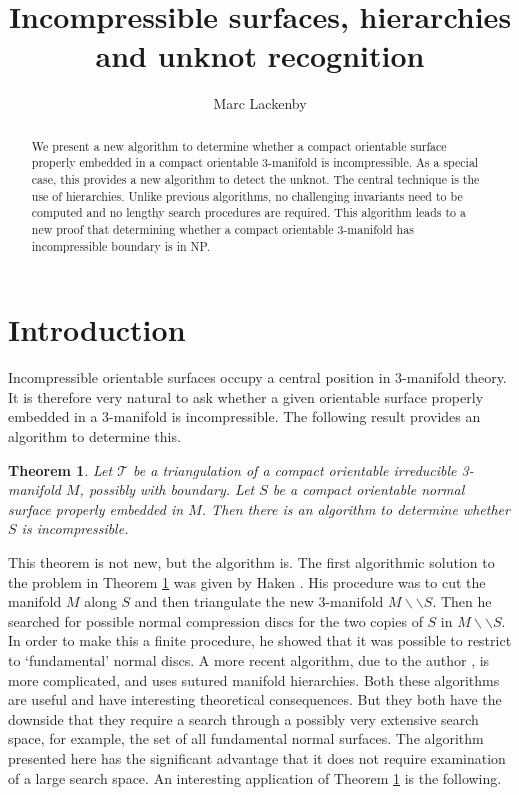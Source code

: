 \documentclass[oneside]{amsart}
\title[Incompressible surfaces, hierarchies and unknot recognition]{Incompressible surfaces, hierarchies \\ and unknot recognition}
\author{Marc Lackenby}
\numberwithin{equation}{section}
\theoremstyle{plain}
\newtheorem{theorem}[equation]{Theorem}
\theoremstyle{definition}
\newcommand{\cut}{\backslash\backslash}
\begin{document}
\begin{abstract} \hspace{0.2cm}
We present a new algorithm to determine whether a compact orientable surface properly embedded in
a compact orientable 3-manifold is incompressible.  As a special case, this provides a new
algorithm to detect the unknot. The central technique is the use of hierarchies. Unlike previous algorithms, no challenging invariants need
to be computed and no lengthy search procedures are required. This algorithm leads to a new proof
that determining whether a compact orientable 3-manifold has incompressible boundary 
is in NP.
\end{abstract}
\maketitle
\tableofcontents


\section{Introduction}\label{Sec:Intro}
Incompressible orientable surfaces occupy a central position in 3-manifold theory. It is therefore very natural to ask whether a given orientable surface properly embedded in a 3-manifold is incompressible. The following result provides an algorithm to determine this.

\begin{theorem}
\label{Thm:AlgorithmIncompressible}
Let $\mathcal{T}$ be a triangulation of a compact orientable irreducible 3-manifold $M$, possibly with boundary. Let $S$ be a compact orientable normal surface properly embedded in $M$. Then there is an algorithm to determine whether $S$ is incompressible.
\end{theorem}

This theorem is not new, but the algorithm is. The first algorithmic solution to the problem in Theorem \ref{Thm:AlgorithmIncompressible} was given by Haken  \cite{Haken:Normal}. His procedure was to cut the manifold $M$ along $S$ and then triangulate the new 3-manifold $M \cut S$. Then he searched for possible normal compression discs for the two copies of $S$ in $M \cut S$. In order to make this a finite procedure, he showed that it was possible to restrict to `fundamental' normal discs. A more recent algorithm, due to the author \cite{Lackenby:EfficientCertification}, is more complicated, and uses sutured manifold hierarchies. Both these algorithms are useful and have interesting theoretical consequences. But they both have the downside that they require a search through a possibly very extensive search space, for example, the set of all fundamental normal surfaces.
The algorithm presented here has the significant advantage that it does not require examination of a large search space.
An interesting application of Theorem \ref{Thm:AlgorithmIncompressible} is the following.
\end{document}
